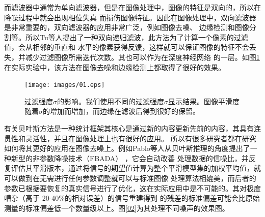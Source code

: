 而滤波器中通常为单向滤波器，但是在图像处理中，图像的特征是双向的，所以在降噪过程中就会出现相位失真
而损伤图像特征。因此在图像处理中，双向滤波器是非常重要的，双向滤波器的应用非常广泛，例如图像去噪、
边缘检测和图像分割等。所以Tu等人\cite{tuTwoWayRecursiveFiltering2021}提出了一种双向递归滤波，此方法为了计算一个像素的过滤值，会从相邻的垂直和
水平的像素获得反馈，这样就可以保证图像的特征不会丢失，并减少过滤图像所需迭代次数。其也可以作为在深度神经网络
的一层。如图\ref{01}在实际实验中，该方法在图像去噪和边缘检测上都取得了很好的效果。

\begin{figure}[htbp]
	\begin{center}
	    \vspace{10pt} %
		\texttt{[image: images/01.eps]}
		\caption{过滤强度$\sigma$的影响。我们使用不同的过滤强度$\sigma$显示结果。图像平滑度随着$\sigma$的增加而增加，而边缘在滤波后得到很好的保留。} 
		\label{01} %
	\end{center}
\end{figure}

有关贝叶斯方法是一种统计框架其核心是通过新的内容更新先前的内容，其具有连贯性和灵活性，并且在图像处理上也有很好的应用。
所以有很多研究者都在研究如何将其更好的应用在图像去噪上。例如Pablo等人从贝叶斯推理的角度提出了一种新型的非参数降噪技术（FBADA）
\cite{sanchez-alarconFullyAdaptiveBayesian2022}，它会自动改善
处理数据的信噪比，并反复评估其平滑版本，通过将信号的期望值计算为整个平滑模型集的加权平均值，就可以做到在无需进行任何参数调整就可以与标准图像
处理算法相媲美，而后者的参数已根据要恢复的真实信号进行了优化，这在实际应用中是不可能的。其对极度嘈杂（高于 20-40\%的相对误差）的信号重建得到
的残差的标准偏差可能会比原始测量的标准偏差低一个数量级以上。图\ref{02}为其处理不同噪声的效果图。

